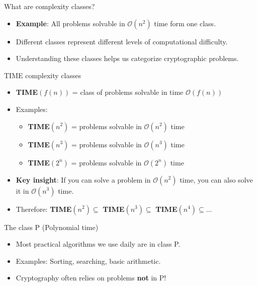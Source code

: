 \documentclass[aspectratio=169, lualatex, handout]{beamer}
\begin{document}
\begin{frame}{What are complexity classes?}
	\begin{itemize}[<+->]
		\item \textbf{Example}: All problems solvable in $\mathcal{O}(n^2)$ time form one class.
		\item Different classes represent different levels of computational difficulty.
		\item Understanding these classes helps us categorize cryptographic problems.
	\end{itemize}
\end{frame}

\begin{frame}{TIME complexity classes}
	\begin{itemize}[<+->]
		\item \textbf{TIME}$(f(n))$ = class of problems solvable in time $\mathcal{O}(f(n))$
		\item Examples:
		      \begin{itemize}
			      \item \textbf{TIME}$(n^2)$ = problems solvable in $\mathcal{O}(n^2)$ time
			      \item \textbf{TIME}$(n^3)$ = problems solvable in $\mathcal{O}(n^3)$ time
			      \item \textbf{TIME}$(2^n)$ = problems solvable in $\mathcal{O}(2^n)$ time
		      \end{itemize}
		\item \textbf{Key insight}: If you can solve a problem in $\mathcal{O}(n^2)$ time, you can also solve it in $\mathcal{O}(n^3)$ time.
		\item Therefore: \textbf{TIME}$(n^2) \subseteq$ \textbf{TIME}$(n^3) \subseteq$ \textbf{TIME}$(n^4) \subseteq \ldots$
	\end{itemize}
\end{frame}

\begin{frame}{The class P (Polynomial time)}
	\begin{itemize}[<+->]
		\item Most practical algorithms we use daily are in class P.
		\item Examples: Sorting, searching, basic arithmetic.
		\item Cryptography often relies on problems \textbf{not} in P!
	\end{itemize}
\end{frame}
\end{document}
